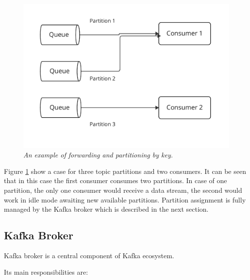 \begin{figure}[H]
    \centering
    \includegraphics[width=1\textwidth]{figures/consumer-kf}
    \caption{\textit{An example of forwarding and partitioning by key.}}
    \label{fig:consumer-kf}
\end{figure}

Figure \ref{fig:consumer-kf} show a case for three topic partitions and two consumers.
It can be seen that in this case the first consumer consumes two partitions.
In case of one partition, the only one consumer would receive a data stream,
the second would work in idle mode awaiting new available partitions.
Partition assignment is fully managed by the Kafka broker which is described
in the next section.

\newpage
\subsection{Kafka Broker}\label{subsec:kafka-broker}
Kafka broker is a central component of Kafka ecosystem.

Its main responsibilities are:

